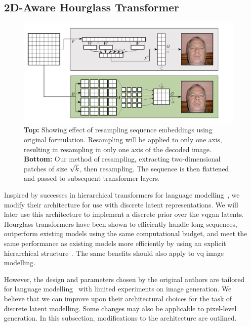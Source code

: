 \subsection{2D-Aware Hourglass Transformer}
\label{subsec:improvedHourglass}

\begin{figure}[htp]
    \label{fig:resample}
    \centering
    \includegraphics[width=\textwidth]{figures/resample.pdf}
    \caption{
        \textbf{Top:} Showing effect of resampling sequence embeddings using
        original formulation. Resampling will be applied to only one axis,
        resulting in resampling in only one axis of the decoded image.
        \textbf{Bottom:} Our method of resampling, extracting 
        two-dimensional patches of size $\sqrt{k}$, then 
        resampling. The sequence is then flattened and passed to
        subsequent transformer layers.
    }
\end{figure}

Inspired by successes in hierarchical transformers for language
modelling~\cite{nawrot2021hierarchical}, we modify their architecture for use
with discrete latent representations. We will later use this architecture to
implement a discrete prior over the \gls{vqgan} latents. Hourglass transformers
have been shown to efficiently handle long sequences, outperform existing models
using the same computational budget, and meet the same performance as existing
models more efficiently by using an explicit hierarchical
structure~\cite{nawrot2021hierarchical}. The same benefits should also apply to
\gls{vq} image modelling. 

However, the design and parameters chosen by the original authors are tailored
for language modelling~\cite{nawrot2021hierarchical} with limited experiments on
image generation. We believe that we can improve upon their architectural
choices for the task of discrete latent modelling. Some changes may also be
applicable to pixel-level generation. In this subsection, modifications to the
architecture are outlined.


